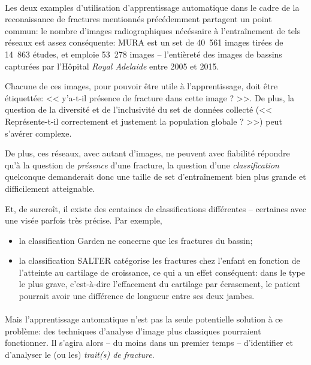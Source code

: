 \documentclass[a4paper]{article}
\begin{document}
\paragraph{}

Les deux examples d'utilisation d'apprentissage automatique dans le cadre de la reconaissance de fractures mentionnés
précédemment partagent un point commun: le nombre d'images radiographiques nécéssaire à l'entraînement de tels réseaux
est assez conséquente: MURA\cite{mura-paper} est un set de 40~561 images tirées de 14~863 études, et
 emploie 53~278 images -- l'entièreté des images de bassins capturées par l'Hôpital \emph{Royal
Adelaide} entre 2005 et 2015\cite{detect-hip}.


Chacune de ces images, pour pouvoir être utile à l'apprentissage, doit être étiquettée: << y'a-t-il présence de fracture
dans cette image ? >>. De plus, la question de la diversité et de l'inclusivité du set de données collecté (<<
Représente-t-il correctement et justement la population globale ? >>) peut s'avérer complexe\cite{dataset-bias}.

De plus, ces réseaux, avec autant d'images, ne peuvent avec fiabilité répondre qu'à la question de \emph{présence} d'une
fracture, la question d'une \emph{classification} quelconque demanderait donc une taille de set d'entraînement bien plus
grande et difficilement atteignable.

Et, de surcroît, il existe des centaines de classifications différentes -- certaines avec une visée parfois très
précise.  Par exemple, 

\begin{itemize}
    \item la classification Garden\cite{garden-paper} ne concerne que les fractures du bassin;
    \item la classification SALTER\cite{salter} catégorise les fractures chez l'enfant en fonction de l'atteinte au
cartilage de croissance, ce qui a un effet conséquent: dans le type le plus grave, c'est-à-dire l'effacement du
cartilage par écrasement, le patient pourrait avoir une différence de longueur entre ses deux jambes.
\end{itemize}

\paragraph{}

Mais l'apprentissage automatique n'est pas la seule potentielle solution à ce problème: des techniques d'analyse d'image
plus classiques pourraient fonctionner.  Il s'agira alors -- du moins dans un premier temps -- d'identifier et
d'analyser le (ou les) \emph{trait(s) de fracture}.
\end{document}
